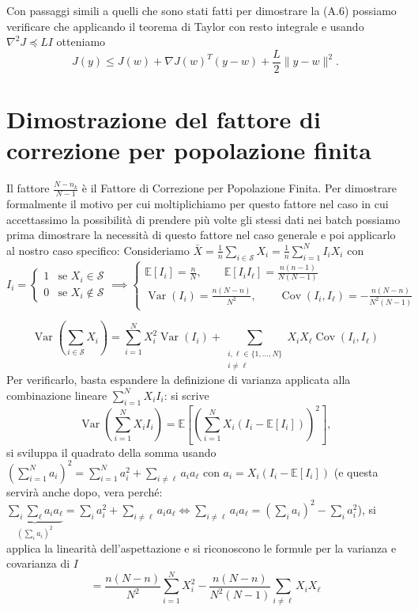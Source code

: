 \documentclass[italian, a4paper, twoside, binding=6mm]{sapthesis}
\begin{document}
Con passaggi simili a quelli che sono stati fatti per dimostrare la (A.6) possiamo verificare che applicando il teorema di Taylor con resto integrale e usando \(\nabla^2 J \preceq LI\) otteniamo
\[
J(y) \le J(w) + \nabla J(w)^T(y - w) + \frac{L}{2}\|y - w\|^2. \tag{A.12}
\]

\newpage


\section{Dimostrazione del fattore di correzione per \newline popolazione finita}\label{app:corr}


Il fattore $\frac{N-n_k}{N-1}$ \`e il Fattore di Correzione per Popolazione Finita. Per dimostrare formalmente il motivo per cui moltiplichiamo per questo fattore nel caso in cui accettassimo la possibilità di prendere più volte gli stessi dati nei batch possiamo prima dimostrare la necessità di questo fattore nel caso generale e poi applicarlo al nostro caso specifico:
Consideriamo $
\bar{X} = \frac{1}{n}\sum_{i \in \mathcal{S}} X_i = \frac{1}{n}\sum_{i=1}^N I_i X_i
$
con
\[
I_i = 
\begin{cases} 
1 & \text{se } X_i \in \mathcal{S} \\ 
0 & \text{se } X_i \notin \mathcal{S}
\end{cases}
 \implies
\begin{cases}
\mathbb{E}[I_i] = \frac{n}{N}, \qquad \mathbb{E}[I_i I_\ell] = \frac{n(n-1)}{N(N-1)}
\\
\operatorname{Var}(I_i) = \frac{n(N-n)}{N^2}, \qquad 
\operatorname{Cov}(I_i, I_\ell) = -\frac{n(N-n)}{N^2(N-1)}
\end{cases}\]


\[
\operatorname{Var}\left(\sum_{i \in \mathcal{S}} X_i\right) = 
\sum_{i=1}^N X_i^2 \operatorname{Var}(I_i) + \sum_{\substack{i,\ell \in \{1,\dots,N\} \\ i \neq \ell}} X_i X_\ell \operatorname{Cov}(I_i, I_\ell)
\]
Per verificarlo, basta espandere la definizione di varianza applicata alla combinazione lineare $\sum_{i=1}^N X_i I_i$: si scrive
\[
\operatorname{Var}\left(\sum_{i=1}^N X_i I_i\right) = \mathbb{E}\left[\left(\sum_{i=1}^N X_i (I_i - \mathbb{E}[I_i])\right)^2\right],
\]
si sviluppa il quadrato della somma usando $\left(\sum_{i=1}^N a_i\right)^2 = \sum_{i=1}^N a_i^2 + \sum_{i \neq \ell} a_i a_\ell$ con $a_i = X_i (I_i - \mathbb{E}[I_i])$ (e questa servirà anche dopo, vera perché:
$\underbrace{\sum_i \sum_\ell a_i a_\ell}_{\left(\sum_i a_i\right)^2} = \sum_i a_i^2 + \sum_{i \neq \ell} a_i a_\ell \iff \sum_{i \neq \ell} a_i a_\ell = \left(\sum_i a_i\right)^2 - \sum_i a_i^2
$), si applica la linearità dell'aspettazione e si riconoscono le formule per la varianza e covarianza di $I$
\[
= \frac{n(N-n)}{N^2} \sum_{i=1}^N X_i^2 - \frac{n(N-n)}{N^2(N-1)} \sum_{i \neq \ell} X_i X_\ell
\]
\end{document}
